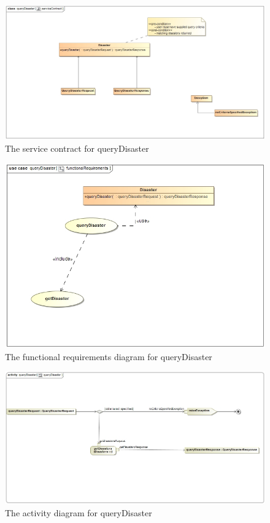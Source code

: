  \begin{figure}[H]
	\centering
	\includegraphics[width=1.0\textwidth]{../images/queryDisasterServiceContract.jpg}
	\caption{The service contract for queryDisaster \label{overflow}}
\end{figure}

\begin{figure}[H]
	\centering
	\includegraphics[width=1.0\textwidth]{../images/queryDisasterFunctionalRequirements.jpg}
	\caption{The functional requirements diagram for queryDisaster \label{overflow}}
\end{figure}

\begin{figure}[H]
	\centering
	\includegraphics[width=1.0\textwidth]{../images/queryDisasterActivityDiagram.jpg}
	\caption{The activity diagram for queryDisaster \label{overflow}}
\end{figure} 

